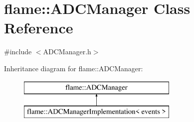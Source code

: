 \hypertarget{classflame_1_1_a_d_c_manager}{\section{flame\-:\-:A\-D\-C\-Manager Class Reference}
\label{classflame_1_1_a_d_c_manager}
}


{\ttfamily \#include $<$A\-D\-C\-Manager.\-h$>$}

Inheritance diagram for flame\-:\-:A\-D\-C\-Manager\-:\begin{figure}[H]
\begin{center}
\leavevmode
\includegraphics[height=2.000000cm]{classflame_1_1_a_d_c_manager}
\end{center}
\end{figure}
